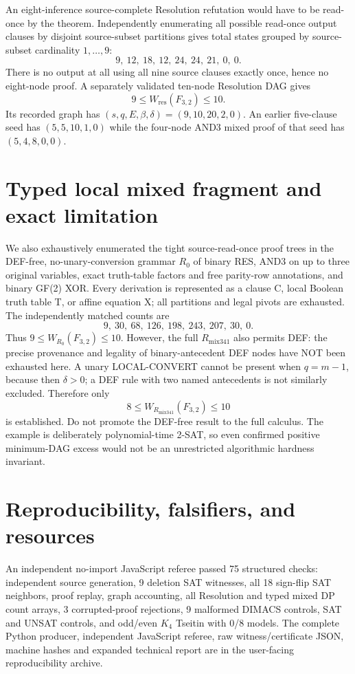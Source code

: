 \documentclass[11pt]{article}
\begin{document}
An eight-inference source-complete Resolution refutation would have to be read-once by the theorem. Independently enumerating all possible read-once output clauses by disjoint source-subset partitions gives total states grouped by source-subset cardinality $1,\ldots,9$:
\[
\boxed{9,\ 12,\ 18,\ 12,\ 24,\ 24,\ 21,\ 0,\ 0}.
\]
There is no output at all using all nine source clauses exactly once, hence no eight-node proof. A separately validated ten-node Resolution DAG gives
\[
\boxed{9\le W_{\mathrm{res}}(F_{3,2})\le10}.
\]
Its recorded graph has $(s,q,E,\beta,\delta)=(9,10,20,2,0)$. An earlier five-clause seed has $(5,5,10,1,0)$ while the four-node AND3 mixed proof of that seed has $(5,4,8,0,0)$.

\section{Typed local mixed fragment and exact limitation}
We also exhaustively enumerated the tight source-read-once proof trees in the DEF-free, no-unary-conversion grammar $R_0$ of binary RES, AND3 on up to three original variables, exact truth-table factors and free parity-row annotations, and binary GF(2) XOR. Every derivation is represented as a clause C, local Boolean truth table T, or affine equation X; all partitions and legal pivots are exhausted. The independently matched counts are
\[
\boxed{9,\ 30,\ 68,\ 126,\ 198,\ 243,\ 207,\ 30,\ 0}.
\]
Thus $9\le W_{R_0}(F_{3,2})\le10$. However, the full $R_{\mathrm{mix341}}$ also permits DEF: the precise provenance and legality of binary-antecedent DEF nodes have NOT been exhausted here. A unary LOCAL-CONVERT cannot be present when $q=m-1$, because then $\delta>0$; a DEF rule with two named antecedents is not similarly excluded. Therefore only
\[
\boxed{8\le W_{R_{\mathrm{mix341}}}(F_{3,2})\le10}
\]
is established. Do not promote the DEF-free result to the full calculus. The example is deliberately polynomial-time 2-SAT, so even confirmed positive minimum-DAG excess would not be an unrestricted algorithmic hardness invariant.

\section{Reproducibility, falsifiers, and resources}
An independent no-import JavaScript referee passed 75 structured checks: independent source generation, 9 deletion SAT witnesses, all 18 sign-flip SAT neighbors, proof replay, graph accounting, all Resolution and typed mixed DP count arrays, 3 corrupted-proof rejections, 9 malformed DIMACS controls, SAT and UNSAT controls, and odd/even $K_4$ Tseitin with 0/8 models. The complete Python producer, independent JavaScript referee, raw witness/certificate JSON, machine hashes and expanded technical report are in the user-facing reproducibility archive.
\end{document}
